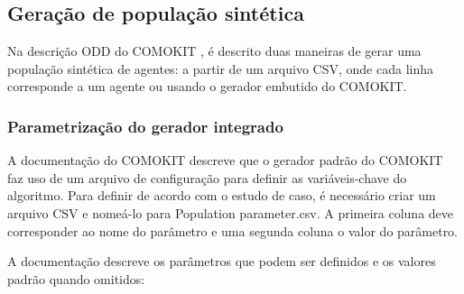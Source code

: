 \subsection{Geração de população sintética}

Na descrição ODD do COMOKIT \cite{ODDCOMOKit32}, é descrito duas maneiras de gerar uma população sintética de agentes: a partir de um arquivo CSV, onde cada linha corresponde a um agente ou usando o gerador embutido do COMOKIT.

\subsubsection{Parametrização do gerador integrado}

A documentação do COMOKIT \cite{ComokitDoc} descreve que o gerador padrão do COMOKIT faz uso de um arquivo de configuração para definir as variáveis-chave do algoritmo. Para definir de acordo com o estudo de caso, é necessário criar um arquivo CSV e nomeá-lo para Population parameter.csv. A primeira coluna deve corresponder ao nome do parâmetro e uma segunda coluna o valor do parâmetro.

A documentação descreve os parâmetros que podem ser definidos e os valores padrão quando omitidos:

